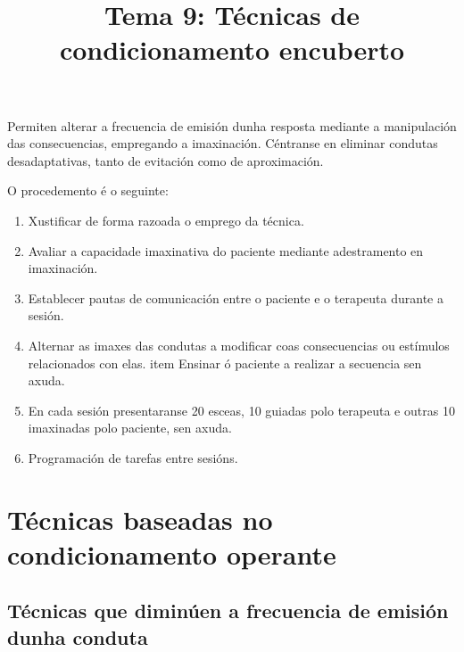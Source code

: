 \documentclass[a4paper,11pt]{article}
\title{Tema 9: Técnicas de condicionamento encuberto}
\date{}
\begin{document}
   

\maketitle 

Permiten alterar a frecuencia de emisión dunha resposta mediante a manipulación das consecuencias, empregando a imaxinación. Céntranse en eliminar condutas desadaptativas, tanto de evitación como
de aproximación.

O procedemento é o seguinte:
\begin{enumerate}
	\item Xustificar de forma razoada o emprego da técnica.
	\item Avaliar a capacidade imaxinativa do paciente mediante adestramento en imaxinación.
	\item Establecer pautas de comunicación entre o paciente e o terapeuta durante a sesión.
	\item Alternar as imaxes das condutas a modificar coas consecuencias ou estímulos relacionados 
	con elas. 
	item Ensinar ó paciente a realizar a secuencia sen axuda.
	\item En cada sesión presentaranse 20 esceas, 10 guiadas polo terapeuta e outras 10 imaxinadas 
	polo paciente, sen axuda.
	\item Programación de tarefas entre sesións.
\end{enumerate}

\section{Técnicas baseadas no condicionamento operante}
\subsection{Técnicas que diminúen a frecuencia de emisión dunha conduta}
\end{document}
